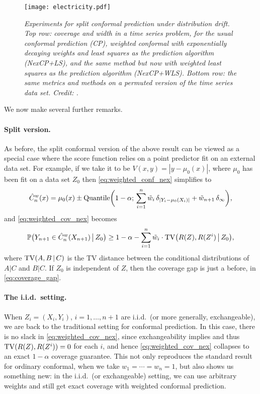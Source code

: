 \documentclass{article}
\begin{document}
\begin{figure}[htb]
\centering
\texttt{[image: electricity.pdf]}
\caption{\it Experiments for split conformal prediction under distribution
  drift. Top row: coverage and width in a time series problem, for the usual
  conformal prediction (CP), weighted conformal with exponentially decaying
  weights and least squares as the prediction algorithm (NexCP+LS), and the same
  method but now with weighted least squares as the prediction algorithm 
  (NexCP+WLS). Bottom row: the same metrics and methods on a permuted version of 
  the time series data set. Credit: \citet{barber2023conformal}.}        
\label{fig:electricity}
\end{figure}

We now make several further remarks. 

\paragraph{Split version.}

As before, the split conformal version of the above result can be viewed as a
special case where the score function relies on a point predictor fit on an
external data set. For example, if we take it to be $V(x,y) = |y-\mu_0(x)|$,
where $\mu_0$ has been fit on a data set $Z_0$ then \eqref{eq:weighted_conf_nex}
simplifies to            
\[
\hat{C}^w_n(x) = \mu_0(x) \pm \mathrm{Quantile}\bigg(1-\alpha; \, \sum_{i=1}^n \tilde{w}_i \,
\delta_{|Y_i - \mu_0(X_i)|} + \tilde{w}_{n+1} \, \delta_\infty \bigg),
\]
and \eqref{eq:weighted_cov_nex} becomes
\[
\mathbb{P}\big( Y_{n+1} \in \hat{C}^w_n(X_{n+1}) \,\big|\, Z_0 \big) \geq 1-\alpha -
\sum_{i=1}^n \tilde{w}_i \cdot \mathrm{TV}\big( R(Z), R(Z^i) \,\big|\, Z_0 \big), 
\]
where $\mathrm{TV}(A, B \,|\, C)$ is the TV distance between the conditional
distributions of $A|C$ and $B|C$. If $Z_0$ is independent of $Z$, then the
coverage gap is just a before, in \eqref{eq:coverage_gap}.

\paragraph{The i.i.d.\ setting.}

When $Z_i=(X_i,Y_i)$, $i=1,\dots,n+1$ are i.i.d.\ (or more generally,
exchangeable), we are back to the traditional setting for conformal
prediction. In this case, there is no slack in \eqref{eq:weighted_cov_nex},
since exchangeability implies  and thus
$\mathrm{TV}(R(Z), R(Z^i)) = 0$ for each $i$, and hence \eqref{eq:weighted_cov_nex}
collapses to an exact $1-\alpha$ coverage guarantee. This not only reproduces
the standard result for ordinary conformal, when we take $w_1 = \cdots = w_n =
1$, but also shows us something new: in the i.i.d.\ (or exchangeable) setting,
we can use arbitrary weights and still get exact coverage with weighted
conformal prediction. 
\end{document}
